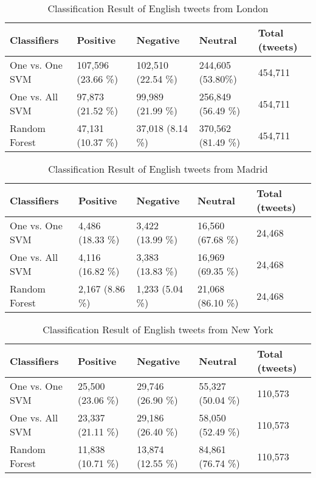 \begin{table}[ht]
	\caption{Classification Result of English tweets from London}
	\begin{tabular}{|l|p{1.8cm}|p{1.8cm}|p{1.8cm}|p{1.8cm}|} \hline
	Classifiers & Positive & Negative & Neutral & Total (tweets)\\ \hline
One vs. One SVM & 107,596 (23.66 \%) & 102,510 (22.54 \%) & 244,605 (53.80\%)& 454,711 \\ \hline
One vs. All SVM & 97,873 (21.52 \%) & 99,989 (21.99 \%) & 256,849 (56.49 \%)& 454,711 \\ \hline
Random Forest   & 47,131 (10.37 \%)  & 37,018 (8.14 \%)  & 370,562 (81.49 \%) & 454,711 \\ \hline
	\end{tabular}
	\label{tab:result_london_en}
\end{table}

\begin{table}[ht]
	\caption{Classification Result of English tweets from Madrid}
	\begin{tabular}{|l|p{1.8cm}|p{1.8cm}|p{1.8cm}|p{1.8cm}|} \hline
	Classifiers & Positive & Negative & Neutral & Total (tweets)\\ \hline
One vs. One SVM & 4,486 (18.33 \%) & 3,422 (13.99 \%)& 16,560 (67.68 \%)& 24,468 \\ \hline
One vs. All SVM & 4,116 (16.82 \%)& 3,383 (13.83 \%)& 16,969 (69.35 \%)& 24,468 \\ \hline
Random Forest   & 2,167 \newline(8.86 \%)& 1,233 \newline(5.04 \%)& 21,068 (86.10 \%)& 24,468 \\ \hline
	\end{tabular}
	\label{tab:result_madrid_en}
\end{table}

\begin{table}[ht]
	\caption{Classification Result of English tweets from New York}
	\begin{tabular}{|l|p{1.8cm}|p{1.8cm}|p{1.8cm}|p{1.8cm}|} \hline

	Classifiers & Positive & Negative & Neutral & Total (tweets)\\ \hline
One vs. One SVM & 25,500 (23.06 \%) & 29,746 (26.90 \%)& 55,327 (50.04 \%)& 110,573 \\ \hline
One vs. All SVM & 23,337 (21.11 \%)& 29,186 (26.40 \%)& 58,050 (52.49 \%)& 110,573 \\ \hline
Random Forest   & 11,838 (10.71 \%)& 13,874 (12.55 \%)& 84,861 (76.74 \%)& 110,573 \\ \hline
	\end{tabular}
	\label{tab:result_newyork_en}
\end{table}

